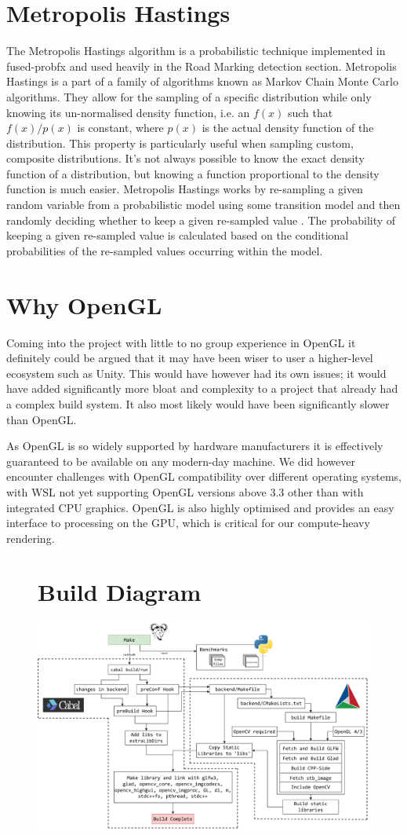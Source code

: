 \documentclass[conference]{IEEEtran}
\begin{document}
\section{Metropolis Hastings}
\label{app:MetropolisHastingsAppendix}
The Metropolis Hastings algorithm is a probabilistic technique implemented in fused-probfx and used heavily in the Road Marking detection section. Metropolis Hastings is a part of a family of algorithms known as Markov Chain Monte Carlo algorithms. They allow for the sampling of a specific distribution while only knowing its un-normalised density function, i.e. an $f(x)$ such that $f(x)/p(x)$ is constant, where $p(x)$ is the actual density function of the distribution. This property is particularly useful when sampling custom, composite distributions. It's not always possible to know the exact density function of a distribution, but knowing a function proportional to the density function is much easier. Metropolis Hastings works by re-sampling a given random variable from a probabilistic model using some transition model and then randomly deciding whether to keep a given re-sampled value \cite{methastings}. The probability of keeping a given re-sampled value is calculated based on the conditional probabilities of the re-sampled values occurring within the model. 

\section{Why OpenGL}
\label{app:unityopengl}
Coming into the project with little to no group experience in OpenGL it definitely could be argued that it may have been wiser to user a higher-level ecosystem such as Unity. This would have however had its own issues; it would have added significantly more bloat and complexity to a project that already had a complex build system. It also most likely would have been significantly slower than OpenGL.

As OpenGL is so widely supported by hardware manufacturers it is effectively guaranteed to be available on any modern-day machine. We did however encounter challenges with OpenGL compatibility over different operating systems, with WSL not yet supporting OpenGL versions above 3.3 other than with integrated CPU graphics. OpenGL is also highly optimised and provides an easy interface to processing on the GPU, which is critical for our compute-heavy rendering.


\begin{figure}[h]
\section{Build Diagram}
    \centering
    \includegraphics[width=\linewidth]{images/Build System.png}
    \label{app:build}
\end{figure}
\end{document}
